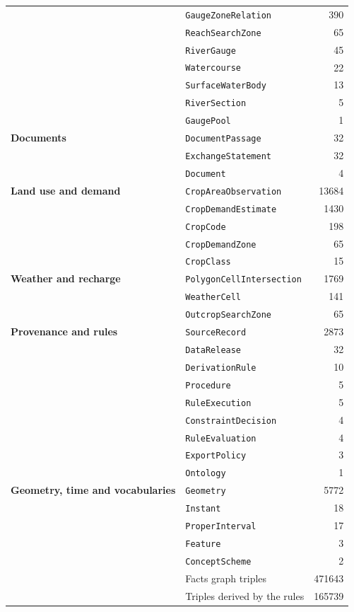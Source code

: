 \begin{table}[p]
\begin{tabular}{@{}llr@{}}
 & \texttt{GaugeZoneRelation} & \num{390} \\
 & \texttt{ReachSearchZone} & \num{65} \\
 & \texttt{RiverGauge} & \num{45} \\
 & \texttt{Watercourse} & \num{22} \\
 & \texttt{SurfaceWaterBody} & \num{13} \\
 & \texttt{RiverSection} & \num{5} \\
 & \texttt{GaugePool} & \num{1} \\
\addlinespace
\textbf{Documents} & \texttt{DocumentPassage} & \num{32} \\
 & \texttt{ExchangeStatement} & \num{32} \\
 & \texttt{Document} & \num{4} \\
\addlinespace
\textbf{Land use and demand} & \texttt{CropAreaObservation} & \num{13684} \\
 & \texttt{CropDemandEstimate} & \num{1430} \\
 & \texttt{CropCode} & \num{198} \\
 & \texttt{CropDemandZone} & \num{65} \\
 & \texttt{CropClass} & \num{15} \\
\addlinespace
\textbf{Weather and recharge} & \texttt{PolygonCellIntersection} & \num{1769} \\
 & \texttt{WeatherCell} & \num{141} \\
 & \texttt{OutcropSearchZone} & \num{65} \\
\addlinespace
\textbf{Provenance and rules} & \texttt{SourceRecord} & \num{2873} \\
 & \texttt{DataRelease} & \num{32} \\
 & \texttt{DerivationRule} & \num{10} \\
 & \texttt{Procedure} & \num{5} \\
 & \texttt{RuleExecution} & \num{5} \\
 & \texttt{ConstraintDecision} & \num{4} \\
 & \texttt{RuleEvaluation} & \num{4} \\
 & \texttt{ExportPolicy} & \num{3} \\
 & \texttt{Ontology} & \num{1} \\
\addlinespace
\textbf{Geometry, time and vocabularies} & \texttt{Geometry} & \num{5772} \\
 & \texttt{Instant} & \num{18} \\
 & \texttt{ProperInterval} & \num{17} \\
 & \texttt{Feature} & \num{3} \\
 & \texttt{ConceptScheme} & \num{2} \\
\midrule
 & Facts graph triples & \num{471643} \\
 & Triples derived by the rules & \num{165739} \\
\bottomrule
\end{tabular}
\end{table}
